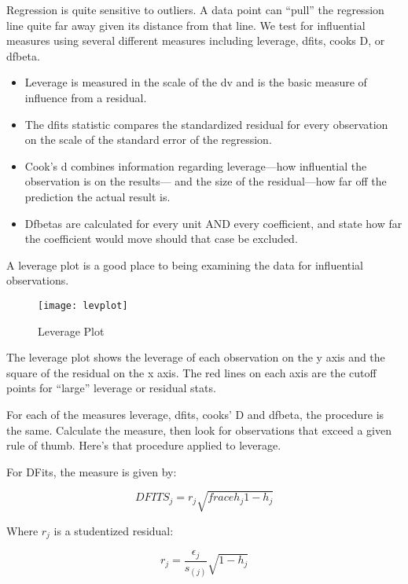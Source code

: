 \documentclass[12pt]{article}
\begin{document}
Regression is quite sensitive to outliers. A data point can ``pull''
the regression line quite far away given its distance from that
line. We test for influential measures using several different
measures including 
leverage, dfits, cooks D, or dfbeta.

\begin{itemize}
\item Leverage is measured in the scale of the dv and is the basic
  measure of influence from a residual.

\item The dfits statistic compares the standardized residual for every
  observation on the scale of the standard error of the regression. 

\item Cook's d combines information regarding leverage---how
  influential the observation is on the results--- and the size of the
  residual---how far off the prediction the actual result is. 

\item Dfbetas are calculated for every unit AND every coefficient, and
  state how far the coefficient would move should that case be
  excluded. 

\end{itemize}

A leverage plot is a good place to being examining the data for
influential observations.

\begin{figure}[ht!]
  \centering
  \caption{Leverage Plot}  
\texttt{[image: levplot]}
  \label{fig:levplot}
\end{figure}

The leverage plot shows the leverage of each observation on the y axis
and the square of the residual on the x axis. The red lines on each
axis are the cutoff points for ``large'' leverage or residual stats. 

For each of the measures leverage, dfits, cooks' D and dfbeta, the
procedure is the same. Calculate the measure, then look for
observations that exceed a given rule of thumb. Here's that procedure
applied to leverage. 

For DFits, the measure is given by:

\begin{equation*}
  DFITS_j=r_j\sqrt{frace{h_j}{1-h_j}}
\end{equation*}

Where $r_j$ is a studentized residual:

\begin{equation*}
  r_j=\frac{\epsilon_j}{s_{(j)}}\sqrt{1-h_j}
\end{equation*}
\end{document}
